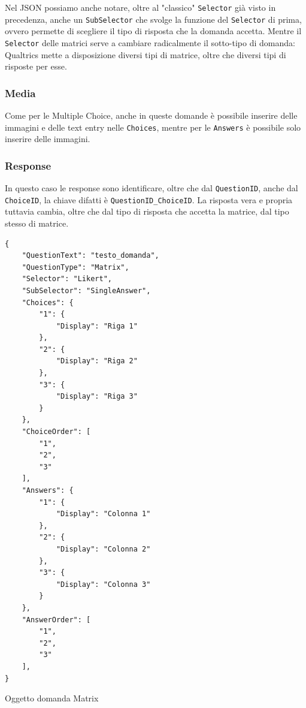 Nel JSON possiamo anche notare, oltre al "classico" \texttt{Selector} già visto in precedenza, anche un \texttt{SubSelector} che svolge la funzione del \texttt{Selector} di prima, ovvero permette di scegliere il tipo di risposta che la domanda accetta. Mentre il \texttt{Selector} delle matrici serve a cambiare radicalmente il sotto-tipo di domanda: Qualtrics mette a disposizione diversi tipi di matrice, oltre che diversi tipi di risposte per esse.

\subsubsection{Media}
Come per le Multiple Choice, anche in queste domande è possibile inserire delle immagini e delle text entry nelle \texttt{Choices}, mentre per le \texttt{Answers} è possibile solo inserire delle immagini.

\subsubsection{Response}
In questo caso le response sono identificare, oltre che dal \texttt{QuestionID}, anche dal \texttt{ChoiceID}, la chiave difatti è \texttt{QuestionID\_ChoiceID}. La risposta vera e propria tuttavia cambia, oltre che dal tipo di risposta che accetta la matrice, dal tipo stesso di matrice.

\begin{json}
\begin{verbatim}
{
    "QuestionText": "testo_domanda",
    "QuestionType": "Matrix",
    "Selector": "Likert",
    "SubSelector": "SingleAnswer",
    "Choices": {
        "1": {
            "Display": "Riga 1"
        },
        "2": {
            "Display": "Riga 2"
        },
        "3": {
            "Display": "Riga 3"
        }
    },
    "ChoiceOrder": [
        "1",
        "2",
        "3"
    ],
    "Answers": {
        "1": {
            "Display": "Colonna 1"
        },
        "2": {
            "Display": "Colonna 2"
        },
        "3": {
            "Display": "Colonna 3"
        }
    },
    "AnswerOrder": [
        "1",
        "2",
        "3"
    ],
}
\end{verbatim}
\caption{Oggetto domanda Matrix}
\label{json:matrix}
\end{json}

